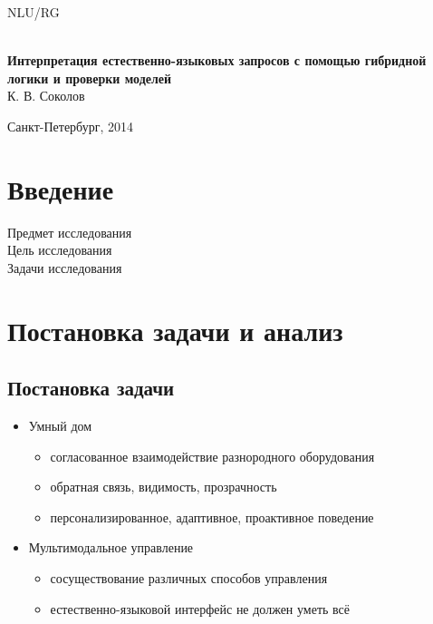 \documentclass[a4paper,12pt]{article}
\begin{document}
\begin{titlepage}

\begin{center}
\vfill

{\Large NLU/RG}\\

\vfill

\ \\

{\large\bf Интерпретация естественно-языковых запросов с помощью гибридной логики и проверки моделей}
\ \\
К. В. Соколов\\

\vfill
\vfill

Санкт-Петербург, 2014
\end{center}

\end{titlepage}


\section{Введение}

Предмет исследования\\
Цель исследования\\
Задачи исследования\\

\section{Постановка задачи и анализ}

\subsection{Постановка задачи}
\begin{itemize}
  \item Умный дом
	\begin{itemize}
  		\item согласованное взаимодействие разнородного оборудования
		\item обратная связь, видимость, прозрачность
		\item персонализированное, адаптивное, проактивное поведение
	\end{itemize}
  \item Мультимодальное управление
	\begin{itemize}
  		\item сосуществование различных способов управления
		\item естественно-языковой интерфейс не должен уметь всё
	\end{itemize}
\end{itemize}
\end{document}
